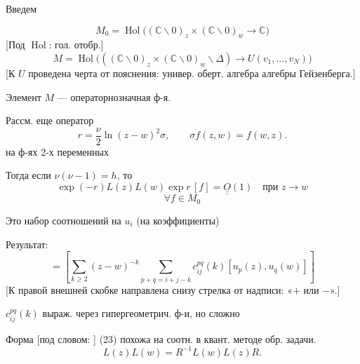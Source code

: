 Введем


\begin{equation*}
M_0=\operatorname{Hol}\bigl((\mathbb C\backslash0)_z\times
(\mathbb C\backslash0)_w\longrightarrow\mathbb C\bigr)
\end{equation*}
[Под $\operatorname{Hol}$: гол. отобр.]
\begin{equation*}
M=\operatorname{Hol}\bigl(((\mathbb C\backslash0)_z\times
(\mathbb C\backslash0)_w\backslash\Delta)\longrightarrow U(v_1,\ldots,v_N)\bigr)
\end{equation*}
[К $U$ проведена черта от пояснения: универ. оберт. алгебра
алгебры Гейзенберга.]

Элемент $M$ — операторнозначная ф-я.

Рассм. еще оператор
\begin{equation*}
r=\frac{\nu}{2}\ln(z-w)^2\sigma,\qquad \sigma f(z,w)=f(w,z).
\end{equation*}
на ф-ях 2-х переменных


Тогда если $\nu(\nu-1)=h$, то
\begin{equation*}
\exp(-r)L(z)L(w)\exp r\,[f]=\underline{\underline{O}}(1)
\quad\text{при }z\longrightarrow w \tag{23}
\end{equation*}
\begin{equation*}
\forall f\in M_0
\end{equation*}

Это набор соотношений на $u_i$ (на коэффициенты)

Результат:
\begin{equation*}
[u_i(z),u_j(w)]=
\left[\sum_{k\geq2}(z-w)^{-k}
\sum_{p+q=i+j-k}c_{ij}^{pq}(k)[u_p(z),u_q(w)]\right] \tag{24}
\end{equation*}
[К правой внешней скобке направлена снизу стрелка от надписи:
«$+$ или $-$».]

$c_{ij}^{pq}(k)$ выраж. через гипергеометрич. ф-и, но сложно

Форма [под словом: ]
(23) похожа на соотн. в квант. методе обр. задачи.
\begin{equation*}
L(z)L(w)=R^{-1}L(w)L(z)R. \tag{25}
\end{equation*}


